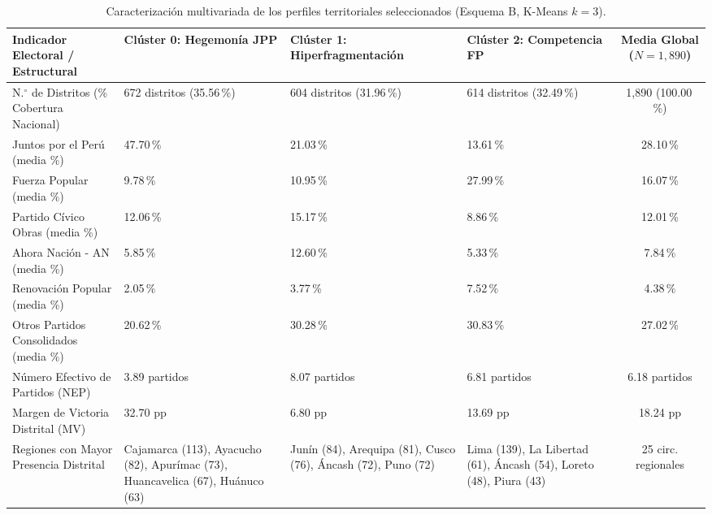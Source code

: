 \documentclass[conference,10pt,letterpaper]{IEEEtran}
\begin{document}
\begin{table}[t]
\centering
\caption{Caracterización multivariada de los perfiles territoriales seleccionados (Esquema B, K-Means $k = 3$).}
\label{tab:perfiles}
\footnotesize
\begin{tabularx}{\textwidth}{@{} p{4.2cm} X X X c @{}}
\toprule
\textbf{Indicador Electoral / Estructural} & \textbf{Clúster 0: Hegemonía JPP} & \textbf{Clúster 1: Hiperfragmentación} & \textbf{Clúster 2: Competencia FP} & \textbf{Media Global ($N = 1{,}890$)} \\
\midrule
N.$^\circ$ de Distritos (\% Cobertura Nacional) & 672 distritos (35.56\,\%) & 604 distritos (31.96\,\%) & 614 distritos (32.49\,\%) & 1,890 (100.00\,\%) \\
Juntos por el Perú (media \%) & 47.70\,\% & 21.03\,\% & 13.61\,\% & 28.10\,\% \\
Fuerza Popular (media \%) & 9.78\,\% & 10.95\,\% & 27.99\,\% & 16.07\,\% \\
Partido Cívico Obras (media \%) & 12.06\,\% & 15.17\,\% & 8.86\,\% & 12.01\,\% \\
Ahora Nación - AN (media \%) & 5.85\,\% & 12.60\,\% & 5.33\,\% & 7.84\,\% \\
Renovación Popular (media \%) & 2.05\,\% & 3.77\,\% & 7.52\,\% & 4.38\,\% \\
Otros Partidos Consolidados (media \%) & 20.62\,\% & 30.28\,\% & 30.83\,\% & 27.02\,\% \\
Número Efectivo de Partidos (NEP) & 3.89 partidos & 8.07 partidos & 6.81 partidos & 6.18 partidos \\
Margen de Victoria Distrital (MV) & 32.70 pp & 6.80 pp & 13.69 pp & 18.24 pp \\
Regiones con Mayor Presencia Distrital & Cajamarca (113), Ayacucho (82), Apurímac (73), Huancavelica (67), Huánuco (63) & Junín (84), Arequipa (81), Cusco (76), Áncash (72), Puno (72) & Lima (139), La Libertad (61), Áncash (54), Loreto (48), Piura (43) & 25 circ. regionales \\
\bottomrule
\end{tabularx}
\end{table}
\end{document}
